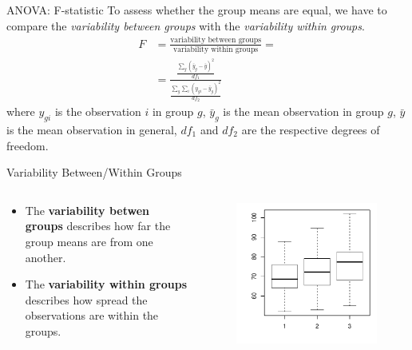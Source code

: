 \begin{frame}{ANOVA: F-statistic}
    To assess whether the group means are equal,
    we have to compare the \emph{variability between groups}
    with the \emph{variability within groups}.
    \begin{align*}
        F &= \frac{\text{variability between groups}}{\text{variability within groups}}=\\
        &= \frac{\frac{\sum_g (\bar{y}_g - \bar{y})^2}{df_1}}{\frac{\sum_g \sum_i (y_{gi} - \bar{y}_g)^2} {df_2}}
    \end{align*}
    where $y_{gi}$ is the observation $i$ in group $g$, $\bar{y}_g$ is the mean observation in group $g$, $\bar{y}$ is the mean observation in general, $df_1$ and $df_2$ are the respective degrees of freedom.
\end{frame}

\begin{frame}{Variability Between/Within Groups}
    \begin{columns}
        \begin{column}{0.5\textwidth}
            \begin{itemize}
                \item The \textbf{variability betwen groups} describes how far the group means are from one another.
                \item The \textbf{variability within groups} describes how spread the observations are within the groups.
            \end{itemize}
        \end{column}
        \begin{column}{0.5\textwidth}
            \begin{figure}
                \includegraphics[width=\linewidth]{R/plots/anova_3_groups_boxplot}
            \end{figure}
        \end{column}
    \end{columns}
\end{frame}

